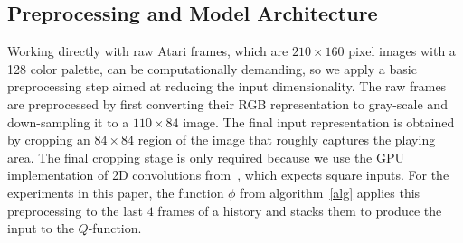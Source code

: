 \documentclass{article} %
\begin{document}





\subsection{Preprocessing and Model Architecture}

Working directly with raw Atari frames, which are $210\times 160$ pixel images with a 128 color palette, can be computationally demanding, so we apply a basic preprocessing step aimed at reducing the input dimensionality.  The raw frames are preprocessed by first converting their RGB representation to gray-scale and down-sampling it to a $110 \times 84$ image. The final input representation is obtained by cropping an $84\times 84$ region of the image that roughly captures the playing area. The final cropping stage is only required because we use the GPU implementation of 2D convolutions from~\cite{krizhevsky-imagenet}, which expects square inputs.  For the experiments in this paper, the function $\phi$ from algorithm~\ref{alg} applies this preprocessing to the last $4$ frames of a history and stacks them to produce the input to the $Q$-function. 
\end{document}
